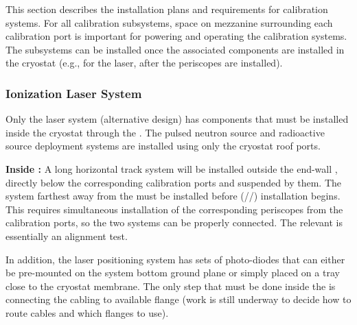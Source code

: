 


This section describes the installation plans and requirements for calibration systems. For all calibration subsystems, space on mezzanine surrounding each calibration port is important for powering and operating the calibration systems. The subsystems can be installed once the associated components are installed in the cryostat (e.g., for the laser, after the periscopes are installed).

\subsubsection{Ionization Laser System} 
Only the laser system (alternative design) has components that must be installed inside the cryostat through the . The pulsed neutron source and radioactive source deployment systems are installed using only the cryostat roof ports.


{\bf Inside :} A long horizontal track system will be installed outside the end-wall , directly below the corresponding calibration ports and suspended by them. The system farthest away from the  must be installed before  (//) installation begins. This requires simultaneous installation of the corresponding periscopes from the calibration ports, so the two systems can be properly connected. The relevant  is essentially an alignment test.

In addition, the laser positioning system has sets of photo-diodes that can either be pre-mounted on the  system bottom ground plane or simply placed on a tray close to the cryostat membrane. The only step that must be done inside the  is connecting the cabling to available flange (work is still underway to decide how to route cables and which flanges to use).

